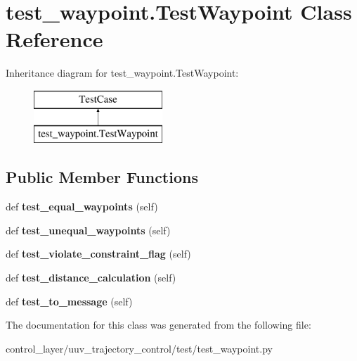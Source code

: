 \hypertarget{classtest__waypoint_1_1TestWaypoint}{}\section{test\+\_\+waypoint.\+Test\+Waypoint Class Reference}
\label{classtest__waypoint_1_1TestWaypoint}
Inheritance diagram for test\+\_\+waypoint.\+Test\+Waypoint\+:\begin{figure}[H]
\begin{center}
\leavevmode
\includegraphics[height=2.000000cm]{classtest__waypoint_1_1TestWaypoint}
\end{center}
\end{figure}
\subsection*{Public Member Functions}
\begin{DoxyCompactItemize}
\item 
\mbox{\label{classtest__waypoint_1_1TestWaypoint_a5e4948374f3f4a6f2de2cef8270a8e75}} 
def {\bfseries test\+\_\+equal\+\_\+waypoints} (self)
\item 
\mbox{\label{classtest__waypoint_1_1TestWaypoint_ac40e56d090781f29cc495b9463964e4c}} 
def {\bfseries test\+\_\+unequal\+\_\+waypoints} (self)
\item 
\mbox{\label{classtest__waypoint_1_1TestWaypoint_ae259b7fbb209572efe2ef8bb54b033ad}} 
def {\bfseries test\+\_\+violate\+\_\+constraint\+\_\+flag} (self)
\item 
\mbox{\label{classtest__waypoint_1_1TestWaypoint_aa1259ed80673e4d9b414a423c6a90301}} 
def {\bfseries test\+\_\+distance\+\_\+calculation} (self)
\item 
\mbox{\label{classtest__waypoint_1_1TestWaypoint_aa25f2dece837433a83add6464d23846e}} 
def {\bfseries test\+\_\+to\+\_\+message} (self)
\end{DoxyCompactItemize}


The documentation for this class was generated from the following file\+:\begin{DoxyCompactItemize}
\item 
control\+\_\+layer/uuv\+\_\+trajectory\+\_\+control/test/test\+\_\+waypoint.\+py\end{DoxyCompactItemize}
